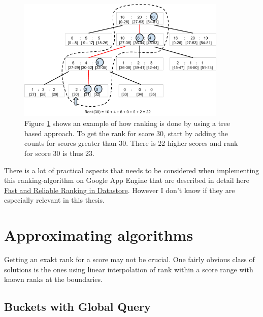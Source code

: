 \begin{figure}[h!]
  \centering
  \caption{Figure \ref{fig:tree} shows an example of how ranking is done by using a tree based approach. To get the rank for score 30, start by adding the counts for scores greater than 30. There is 22 higher scores and rank for score 30 is thus 23.}
  \label{fig:tree}
  \includegraphics[width=10cm]{img/tree}
\end{figure}

\begin{shaded} There is a lot of practical aspects that needs to be considered when implementing this ranking-algorithm on Google App Engine that are described in detail here
\href{https://cloud.google.com/datastore/docs/articles/fast-and-reliable-ranking-in-datastore/}{Fast and Reliable Ranking in Datastore}. However I don't know if they are especially relevant in this thesis.
\end{shaded}

\section{Approximating algorithms}

Getting an exakt rank for a score may not be crucial. One fairly obvious class of solutions is the ones using linear interpolation of rank within a score range with known ranks at the boundaries.





\subsection{\label{bucket}Buckets with Global Query}


